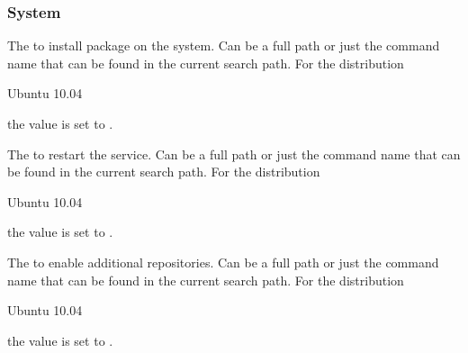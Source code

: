 \subsubsection*{System}


The  to install package on the system. Can be a full path or
just the command name that can be found in the current search path. 
For the distribution
\begin{inparaitem}
\item[\TheDistribution{ubuntu}] Ubuntu 10.04
\end{inparaitem}
the value is set to .


The  to restart the service. Can be a full path or
just the command name that can be found in the current search path. 
For the distribution
\begin{inparaitem}
\item[\TheDistribution{ubuntu}] Ubuntu 10.04
\end{inparaitem}
the value is set to .


The  to enable additional repositories. Can be a full path or
just the command name that can be found in the current search path. 
For the distribution
\begin{inparaitem}
\item[\TheDistribution{ubuntu}] Ubuntu 10.04
\end{inparaitem}
the value is set to .


